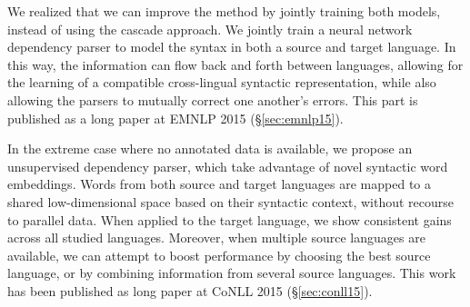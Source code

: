 \documentclass[12pt,twoside,final,hidelinks]{ltthesis}
\theoremstyle{definition}
\newcommand\conllv{CoNLL 2015 (\S\ref{sec:conll15})}
\newcommand\emnlpv{EMNLP 2015 (\S\ref{sec:emnlp15})}
\begin{document}
We realized that we can improve the method by jointly training both models, instead of using the cascade approach. We jointly train a neural network dependency parser to model the syntax in both a source and target language. In this way, the information can flow back and forth between languages, allowing for the learning of a compatible cross-lingual syntactic representation, while also allowing the parsers to mutually correct one another's errors. This part is published as a long paper at \emnlpv. 

In the extreme case where no annotated data is available, we propose an unsupervised dependency parser, which take advantage of novel 
syntactic word embeddings. Words from both source and target languages are mapped to a shared low-dimensional
space based on their syntactic context, without recourse to parallel data.
When applied to the target language, we show consistent gains across all studied languages.
Moreover, when multiple source languages are available, we can attempt to boost
performance by choosing the best source language, or by combining
information from several source languages. %
This work has been published as long paper at \conllv. 
\end{document}
